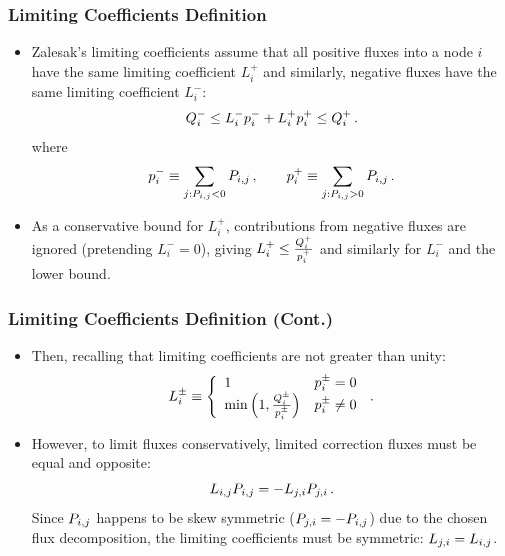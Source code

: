 \documentclass{beamer} \useoutertheme{infolines}
\begin{document}
\begin{frame}
\frametitle{Limiting Coefficients Definition}

\begin{itemize}
   \item Zalesak's limiting coefficients assume that
      all positive fluxes into a node $i$ have the same limiting coefficient
      $L^+_i$ and similarly, negative fluxes have the same limiting coefficient
      $L^-_i$:
      \begin{equation}
        Q^-_i \leq L^-_i p^-_i
          + L^+_i p^+_i \leq Q^+_i \,.
      \end{equation}
      where
      \begin{equation}
        \correctionfluxletter_i^- \equiv \sum\limits_{j:\correctionfluxij<0}
          \correctionfluxij \eqc \qquad
        \correctionfluxletter_i^+ \equiv \sum\limits_{j:\correctionfluxij>0}
          \correctionfluxij \eqp
      \end{equation}
   \item As a conservative bound for $L^+_i$, contributions from negative fluxes
      are ignored (pretending $L_i^-=0$), giving
      $L^+_i \leq \frac{Q_i^+}{p_i^+}$
      and similarly for $L^-_i$ and the lower bound.
\end{itemize}

\end{frame}
\begin{frame}
\frametitle{Limiting Coefficients Definition (Cont.)}

\begin{itemize}
   \item Then, recalling that limiting coefficients are not greater than unity:
      \begin{equation}
         L_i^\pm \equiv\left\{
            \begin{array}{l l}
               1 & p_i^\pm = 0\\
               \min\left(1,\frac{Q_i^\pm}{p_i^\pm}\right) &
                 p_i^\pm \ne 0
            \end{array}
            \right. \,.
      \end{equation}
   \item However, to limit fluxes conservatively, limited correction fluxes must
      be equal and opposite:
      \begin{equation}
        L\ij \correctionfluxij = -L_{j,i}
          \MakeUppercase{\correctionfluxletter}_{j,i} \eqp
      \end{equation}
      Since $\correctionfluxij$ happens to be skew symmetric
      ($\MakeUppercase{\correctionfluxletter}_{j,i}=-\correctionfluxij$) due to the
      chosen flux decomposition, the limiting coefficients must be symmetric:
      $L_{j,i} = L_{i,j}$.
\end{itemize}

\end{frame}
\end{document}
